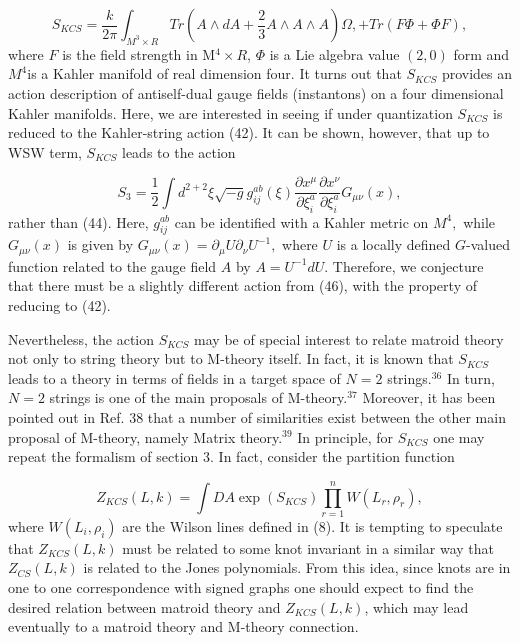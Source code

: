 \documentclass[a4paper,12pt]{article}
\begin{document}
\begin{equation}
S_{KCS}=\frac{k}{2\pi }\int_{M^{3}\times R}Tr(A\wedge dA+\frac{2}{3}A\wedge
A\wedge A)\Omega ,+Tr(F\Phi +\Phi F),  \label{46}
\end{equation}
where $F$ is the field strength in M$^{4}\times R$, $\Phi $ is a Lie algebra
value $(2,0)$ form and $M^{4}$is a Kahler manifold of real dimension four.
It turns out that $S_{KCS}$ provides an action description of antiself-dual
gauge fields (instantons) on a four dimensional Kahler manifolds. Here, we
are interested in seeing if under quantization $S_{KCS}$ is reduced to the
Kahler-string action (42). It can be shown, however, that up to WSW term, $%
S_{KCS}$ leads to the action

\begin{equation}
S_{3}=\frac{1}{2}\int d^{2+2}\xi \sqrt{-g}g_{ij}^{ab}(\xi )\frac{\partial
x^{\mu }}{\partial \xi _{i}^{a}}\frac{\partial x^{\nu }}{\partial \xi
_{i}^{a}}G_{\mu \nu }(x),  \label{47}
\end{equation}
rather than (44). Here, $g_{ij}^{ab}$ can be identified with a Kahler metric
on $M^{4},$ while $G_{\mu \nu }(x)$ is given by $G_{\mu \nu }(x)=\partial
_{\mu }U\partial _{\nu }U^{-1},$ where $U$ is a locally defined $G$-valued
function related to the gauge field $A$ by $A=U^{-1}dU.$ Therefore, we
conjecture that there must be a slightly different action from (46), with
the property of reducing to (42).

Nevertheless, the action $S_{KCS}$ may be of special interest to relate
matroid theory not only to string theory but to M-theory itself. In fact, it
is known that $S_{KCS}$ leads to a theory in terms of fields in a target
space of $N=2$ strings.$^{36}$ In turn, $N=2$ strings is one of the main
proposals of M-theory.$^{37}$ Moreover, it has been pointed out in Ref. 38
that a number of similarities exist between the other main proposal of
M-theory, namely Matrix theory.$^{39}$ In principle, for $S_{KCS}$ one may
repeat the formalism of section 3. In fact, consider the partition function

\begin{equation}
Z_{KCS}(L,k)=\int DA\exp (S_{KCS})\prod\limits_{r=1}^{n}W(L_{r},\rho _{r}),
\label{48}
\end{equation}
where $W(L_{i},\rho _{i})$ are the Wilson lines defined in (8). It is
tempting to speculate that $Z_{KCS}(L,k)$ must be related to some knot
invariant in a similar way that $Z_{CS}(L,k)$ is related to the Jones
polynomials. From this idea, since knots are in one to one correspondence
with signed graphs one should expect to find the desired relation between
matroid theory and $Z_{KCS}(L,k)$, which may lead eventually to a matroid
theory and M-theory connection.
\end{document}
